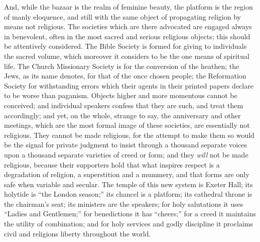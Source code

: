 And, while
the bazaar is the realm of feminine beauty, the platform is the region
of manly eloquence, and still with the same object of propagating
religion by means not religious. The societies which are there advocated
are engaged always in benevolent, often in the most sacred and serious
religious objects; this should be attentively considered. The Bible
Society is formed for giving to individuals the sacred volume, which
moreover it considers to be the one means of spiritual life. The Church
Missionary Society is for the conversion of the heathen; the Jews, as
its name denotes,
for that of the once chosen people; the Reformation Society for
withstanding errors which their agents in their printed papers declare
to be worse than paganism. Objects higher and more momentous cannot be
conceived; and individual speakers confess that they are such, and treat
them accordingly; and yet, on the whole, strange to say, the anniversary
and other meetings, which are the most formal image of these societies,
are essentially not religious. They cannot be made religious, for the
attempt to make them so would be the signal for private judgment to
insist through a thousand separate voices upon a thousand separate
varieties of creed or form; and they \emph{will} not be made religious,
because their supporters hold that what inspires respect is a
degradation of religion, a superstition and a mummery, and that forms
are only safe when variable and secular. The temple of this new system
is Exeter Hall; its holytide is ``the London season;'' its chancel is
a platform; its cathedral throne is the chairman's seat; its ministers
are the speakers; for holy salutations it uses ``Ladies and
Gentlemen;'' for benedictions it has ``cheers;'' for a creed it
maintains the utility of combination; and for holy services and godly
discipline it proclaims civil and religions liberty throughout the
world.

